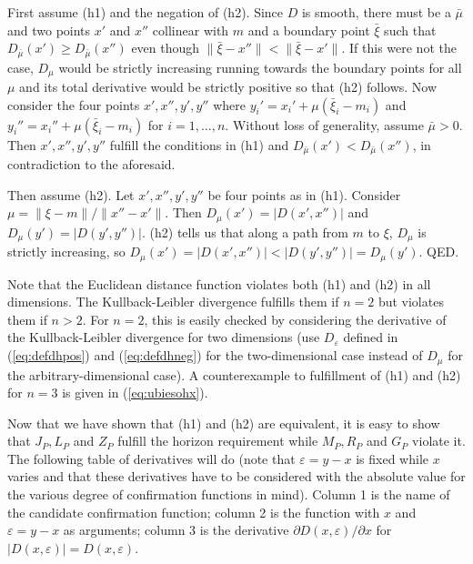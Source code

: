 \documentclass[phd,12pt,oneside]{ubcthesis}
\begin{document}
First assume (h1) and the negation of (h2). Since $D$ is smooth, there
must be a $\bar{\mu}$ and two points $x'$ and $x''$ collinear with $m$
and a boundary point $\bar{\xi}$ such that
$D_{\bar{\mu}}(x')\geq{}D_{\bar{\mu}}(x'')$ even though
$\|\bar{\xi}-x''\|<\|\bar{\xi}-x'\|$. If this were not the case,
$D_{\mu}$ would be strictly increasing running towards the boundary
points for all $\mu$ and its total derivative would be strictly
positive so that (h2) follows. Now consider the four points
$x',x'',y',y''$ where $y_{i}'=x_{i}'+\mu(\bar{\xi}_{i}-m_{i})$ and
$y_{i}''=x_{i}''+\mu(\bar{\xi}_{i}-m_{i})$ for $i=1,\ldots,n$. Without
loss of generality, assume $\bar{\mu}>0$. Then $x',x'',y',y''$ fulfill
the conditions in (h1) and $D_{\bar{\mu}}(x')<{}D_{\bar{\mu}}(x'')$,
in contradiction to the aforesaid.

Then assume (h2). Let $x',x'',y',y''$ be four points as in (h1).
Consider $\mu=\|\xi-m\|/\|x''-x'\|$. Then $D_{\mu}(x')=|D(x',x'')|$
and $D_{\mu}(y')=|D(y',y'')|$. (h2) tells us that along a path from
$m$ to $\xi$, $D_{\mu}$ is strictly increasing, so
$D_{\mu}(x')=|D(x',x'')|<|D(y',y'')|=D_{\mu}(y')$. QED.

Note that the Euclidean distance function violates both (h1) and (h2)
in all dimensions. The Kullback-Leibler divergence fulfills them if
$n=2$ but violates them if $n>2$. For $n=2$, this is easily checked by
considering the derivative of the Kullback-Leibler divergence for two
dimensions (use $D_{\varepsilon}$ defined in (\ref{eq:defdhpos}) and
(\ref{eq:defdhneg}) for the two-dimensional case instead of $D_{\mu}$
for the arbitrary-dimensional case). A counterexample to fulfillment
of (h1) and (h2) for $n=3$ is given in (\ref{eq:ubiesohx}).

Now that we have shown that (h1) and (h2) are equivalent, it is easy
to show that $J_{P},L_{P}$ and $Z_{P}$ fulfill the horizon requirement
while $M_{P},R_{P}$ and $G_{P}$ violate it. The following table of
derivatives will do (note that $\varepsilon=y-x$ is fixed while $x$
varies and that these derivatives have to be considered with the
absolute value for the various degree of confirmation functions in
mind). Column 1 is the name of the candidate confirmation function;
column 2 is the function with $x$ and $\varepsilon=y-x$ as arguments;
column 3 is the derivative $\partial{}D(x,\varepsilon)/\partial{}x$
for $|D(x,\varepsilon)|=D(x,\varepsilon)$.
\end{document}
